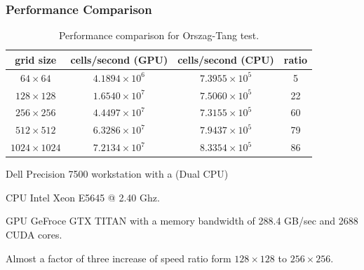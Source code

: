 \documentclass{beamer}
\begin{document}
\begin{frame}[fragile]
\frametitle{Performance Comparison}
\begin{table}[htbp]%
\caption{Performance comparison for Orszag-Tang \citep{Orszag:1979} test.}
\begin{tabular*}{\textwidth}{@{\extracolsep{\fill}} cccc}
\\ 
\hline 
\hline 
grid size & cells/second (GPU) & cells/second (CPU) & ratio \\
\hline
$64\times64$ & $4.1894\times10^6$ & $7.3955\times10^5$ & 5 \\
$128\times128$ & $1.6540\times10^7$ & $7.5060\times10^5$ & 22 \\
$256\times256$ & $4.4497\times10^7$ & $7.3155\times10^5$ & 60 \\
$512\times512$ & $6.3286\times10^7$ & $7.9437\times10^5$ & 79 \\
$1024\times1024$ & $7.2134\times10^7$ & $8.3354\times10^5$ & 86 \\
\hline
\end{tabular*}
\end{table}

\bei
\item Dell Precision 7500 workstation with a (Dual CPU) 
\item CPU Intel Xeon E5645 @ 2.40 Ghz.
\item GPU GeFroce GTX TITAN with a memory bandwidth of 288.4 GB/sec and 2688 CUDA cores.
\item Almost a factor of three increase of speed ratio form $128\times128$ to $256\times256$.
\ebi
\end{frame}
\end{document}

